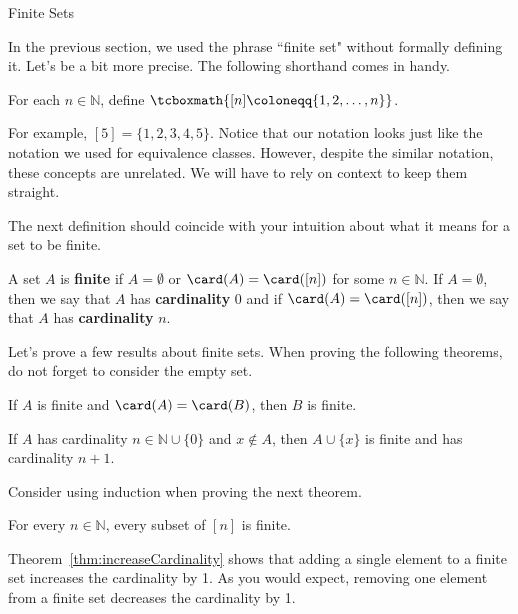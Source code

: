 \begin{section}{Finite Sets}\label{sec:Finite_Sets}

In the previous section, we used the phrase ``finite set" without formally defining it. Let's be a bit more precise. The following shorthand comes in handy.

\begin{definition}
For each $n\in \mathbb{N}$, define $\tcboxmath{[n]\coloneqq \{1,2,\ldots,n\}}$.
\end{definition}

For example, $[5]=\{1,2,3,4,5\}$.  Notice that our notation looks just like the notation we used for equivalence classes. However, despite the similar notation, these concepts are unrelated. We will have to rely on context to keep them straight.

The next definition should coincide with your intuition about what it means for a set to be finite.

\begin{definition}
A set $A$ is \textbf{finite} if $A=\emptyset$ or $\card(A)=\card([n])$ for some $n\in\mathbb{N}$. If $A=\emptyset$, then we say that $A$ has \textbf{cardinality} 0 and if $\card(A)=\card([n])$, then we say that $A$ has \textbf{cardinality} $n$.
\end{definition}

Let's prove a few results about finite sets. When proving the following theorems, do not forget to consider the empty set.

\begin{theorem}\label{thm:finiteSetsSameCardinality}
If $A$ is finite and $\card(A)=\card(B)$, then $B$ is finite.
\end{theorem}

\begin{theorem}\label{thm:increaseCardinality}
If $A$ has cardinality $n\in\mathbb{N}\cup\{0\}$ and $x\notin A$, then $A\cup\{x\}$ is finite and has cardinality $n+1$.
\end{theorem}

Consider using induction when proving the next theorem.

\begin{theorem}\label{thm:subsetsFiniteSets}
For every $n\in\mathbb{N}$, every subset of $[n]$ is finite.
\end{theorem}

Theorem~\ref{thm:increaseCardinality} shows that adding a single element to a finite set increases the cardinality by 1. As you would expect, removing one element from a finite set decreases the cardinality by 1.


\end{section}
